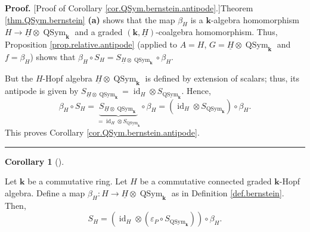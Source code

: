 \documentclass
[numbers=enddot,12pt,final,onecolumn,notitlepage,abstracton]{scrartcl}%
\theoremstyle{definition}
\newtheorem{coro}[theo]{Corollary}
\newenvironment{corollary}[1][]
{\begin{coro}[#1]\begin{leftbar}}
{\end{leftbar}\end{coro}}
\newenvironment{proof}[1][Proof]{\noindent\textbf{#1.} }{\ \rule{0.5em}{0.5em}}
\begin{document}
\begin{proof}
[Proof of Corollary \ref{cor.QSym.bernstein.antipode}.]Theorem
\ref{thm.QSym.bernstein} \textbf{(a)} shows that the map $\beta_{H}$ is a
$\mathbf{k}$-algebra homomorphism $H\rightarrow\underline{H}\otimes
\operatorname*{QSym}\nolimits_{\mathbf{k}}$ and a graded $\left(
\mathbf{k},\underline{H}\right)  $-coalgebra homomorphism. Thus, Proposition
\ref{prop.relative.antipode} (applied to $A=H$, $G=\underline{H}%
\otimes\operatorname*{QSym}\nolimits_{\mathbf{k}}$ and $f=\beta_{H}$) shows
that $\beta_{H}\circ S_{H}=S_{\underline{H}\otimes\operatorname*{QSym}%
\nolimits_{\mathbf{k}}}\circ\beta_{H}$.

But the $H$-Hopf algebra $\underline{H}\otimes\operatorname*{QSym}%
\nolimits_{\mathbf{k}}$ is defined by extension of scalars; thus, its antipode
is given by $S_{\underline{H}\otimes\operatorname*{QSym}\nolimits_{\mathbf{k}%
}}=\operatorname*{id}\nolimits_{H}\otimes S_{\operatorname*{QSym}%
\nolimits_{\mathbf{k}}}$. Hence,%
\[
\beta_{H}\circ S_{H}=\underbrace{S_{\underline{H}\otimes\operatorname*{QSym}%
\nolimits_{\mathbf{k}}}}_{=\operatorname*{id}\nolimits_{H}\otimes
S_{\operatorname*{QSym}\nolimits_{\mathbf{k}}}}\circ\beta_{H}=\left(
\operatorname*{id}\nolimits_{H}\otimes S_{\operatorname*{QSym}%
\nolimits_{\mathbf{k}}}\right)  \circ\beta_{H}.
\]
This proves Corollary \ref{cor.QSym.bernstein.antipode}.
\end{proof}

\begin{corollary}
\label{cor.QSym.bernstein.antipodeH}Let $\mathbf{k}$ be a commutative ring.
Let $H$ be a commutative connected graded $\mathbf{k}$-Hopf algebra. Define a
map $\beta_{H}:H\rightarrow\underline{H}\otimes\operatorname*{QSym}%
\nolimits_{\mathbf{k}}$ as in Definition \ref{def.bernstein}. Then,%
\[
S_{H}=\left(  \operatorname*{id}\nolimits_{H}\otimes\left(  \varepsilon
_{P}\circ S_{\operatorname*{QSym}\nolimits_{\mathbf{k}}}\right)  \right)
\circ\beta_{H}.
\]

\end{corollary}
\end{document}
